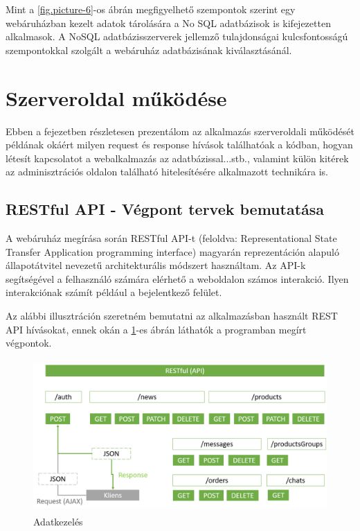 Mint a \ref{fig.picture-6}-os ábrán megfigyelhető szempontok szerint egy webáruházban kezelt adatok tárolására a No SQL adatbázisok is kifejezetten alkalmasok. A NoSQL adatbázisszerverek jellemző tulajdonságai kulcsfontosságú szempontokkal szolgált a webáruház adatbázisának kiválasztásánál.

\section{Szerveroldal működése}

Ebben a fejezetben részletesen prezentálom az alkalmazás szerveroldali működését példának okáért milyen request és response hívások találhatóak a kódban, hogyan létesít kapcsolatot a webalkalmazás az adatbázissal...stb., valamint külön kitérek az adminisztrációs oldalon található hitelesítésére alkalmazott technikára is.

\subsection{RESTful API - Végpont tervek bemutatása}

A webáruház megírása során RESTful API-t (feloldva: Representational State Transfer Application programming interface) magyarán reprezentáción alapuló állapotátvitel nevezetű architekturális módszert használtam. Az API-k segítségével a felhasználó számára elérhető a weboldalon számos interakció. Ilyen interakciónak számít például a bejelentkező felület.

\bigskip
Az alábbi illusztráción szeretném bemutatni az alkalmazásban használt REST API hívásokat, ennek okán a \ref{fig.picture-7}-es ábrán láthatók a programban megírt végpontok.


\begin{figure}[H]
	\centering
	\includegraphics[width=1.0\textwidth,height=220px]{images/restapi_bemutatasa.png}
	\caption{Adatkezelés}
	\label{fig.picture-7}
\end{figure}

